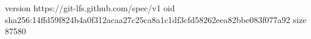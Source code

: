 version https://git-lfs.github.com/spec/v1
oid sha256:14ffd59f824b4a0f312acaa27c25ca8a1c1df3cfd58262eea82bbe083f077a92
size 87580
